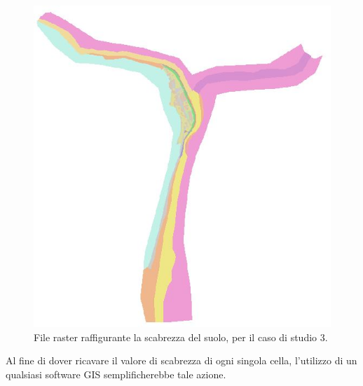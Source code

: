 \begin{figure}[H] \centering
    \includegraphics[scale=0.4]{immagini/land_cover_3.JPG}
    \caption{File raster raffigurante la scabrezza del suolo, per il caso di studio 3.}
    \label{figure:land_cover_3}
\end{figure}
Al fine di dover ricavare il valore di scabrezza di ogni singola cella, l'utilizzo di un qualsiasi software GIS semplificherebbe tale azione.

